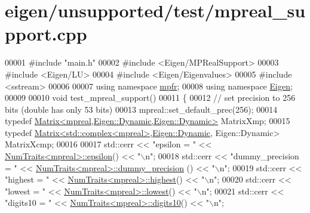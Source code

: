 \hypertarget{eigen_2unsupported_2test_2mpreal__support_8cpp_source}{}\section{eigen/unsupported/test/mpreal\+\_\+support.cpp}
\label{eigen_2unsupported_2test_2mpreal__support_8cpp_source}

\begin{DoxyCode}
00001 \textcolor{preprocessor}{#include "main.h"}
00002 \textcolor{preprocessor}{#include <Eigen/MPRealSupport>}
00003 \textcolor{preprocessor}{#include <Eigen/LU>}
00004 \textcolor{preprocessor}{#include <Eigen/Eigenvalues>}
00005 \textcolor{preprocessor}{#include <sstream>}
00006 
00007 \textcolor{keyword}{using namespace }\hyperlink{namespacempfr}{mpfr};
00008 \textcolor{keyword}{using namespace }\hyperlink{namespace_eigen}{Eigen};
00009 
00010 \textcolor{keywordtype}{void} test\_mpreal\_support()
00011 \{
00012   \textcolor{comment}{// set precision to 256 bits (double has only 53 bits)}
00013   mpreal::set\_default\_prec(256);
00014   \textcolor{keyword}{typedef} \hyperlink{group___core___module_class_eigen_1_1_matrix}{Matrix<mpreal,Eigen::Dynamic,Eigen::Dynamic>} 
      MatrixXmp;
00015   \textcolor{keyword}{typedef} \hyperlink{group___core___module_class_eigen_1_1_matrix}{Matrix<std::complex<mpreal>},\hyperlink{namespace_eigen_ad81fa7195215a0ce30017dfac309f0b2}{Eigen::Dynamic},
      Eigen::Dynamic> MatrixXcmp;
00016 
00017   std::cerr << \textcolor{stringliteral}{"epsilon =         "} << \hyperlink{group___core___module_struct_eigen_1_1_num_traits}{NumTraits<mpreal>::epsilon}() << \textcolor{stringliteral}{"\(\backslash\)n"};
00018   std::cerr << \textcolor{stringliteral}{"dummy\_precision = "} << \hyperlink{group___core___module_struct_eigen_1_1_num_traits}{NumTraits<mpreal>::dummy\_precision}
      () << \textcolor{stringliteral}{"\(\backslash\)n"};
00019   std::cerr << \textcolor{stringliteral}{"highest =         "} << \hyperlink{group___core___module_struct_eigen_1_1_num_traits}{NumTraits<mpreal>::highest}() << \textcolor{stringliteral}{"\(\backslash\)n"};
00020   std::cerr << \textcolor{stringliteral}{"lowest =          "} << \hyperlink{group___core___module_struct_eigen_1_1_num_traits}{NumTraits<mpreal>::lowest}() << \textcolor{stringliteral}{"\(\backslash\)n"};
00021   std::cerr << \textcolor{stringliteral}{"digits10 =        "} << \hyperlink{group___core___module_struct_eigen_1_1_num_traits}{NumTraits<mpreal>::digits10}() << \textcolor{stringliteral}{"\(\backslash\)n"};

\end{DoxyCode}
